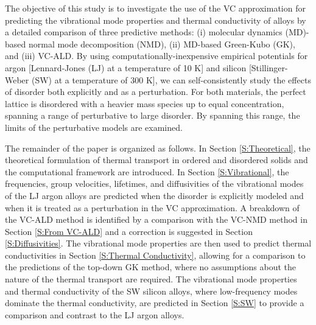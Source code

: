 \documentclass[aps,prb,onecolumn,preprint,footinbib,superscriptaddress,amsmath,amssymb,floatfix]{revtex4}
\begin{document}
The objective of this study is to investigate the use of the VC 
approximation for predicting the vibrational mode properties and 
thermal conductivity of alloys by a detailed comparison 
of three predictive methods: (i) molecular dynamics (MD)-based 
normal mode decomposition (NMD), (ii) MD-based Green-Kubo (GK), 
and (iii) VC-ALD. By using computationally-inexpensive  
empirical potentials for argon [Lennard-Jones (LJ) at a temperature of 10 K]
\cite{ashcroft_solid_1976} 
and silicon [Stillinger-Weber (SW) at a temperature of 300 K],
\cite{stillinger_computer_1985}   
we can self-consistently study the effects of disorder both explicitly 
and as a perturbation. For both materials, the perfect lattice is 
disordered with a heavier mass species up to equal 
concentration, spanning 
a range of perturbative to large disorder. By spanning this range, 
the limits of the perturbative models are examined.

The remainder of the paper is organized as follows. 
In Section \ref{S:Theoretical}, the theoretical 
formulation of thermal transport in ordered and disordered solids 
and the computational framework are introduced. 
In Section \ref{S:Vibrational}, the frequencies, 
group velocities, lifetimes, and diffusivities of the 
vibrational modes of the LJ argon alloys are 
predicted when the disorder is explicitly modeled and when it is 
treated as a perturbation in the VC approximation. 
A breakdown of the VC-ALD method is identified by a comparison 
with the VC-NMD method in 
Section \ref{S:From VC-ALD}   
and a correction is suggested in Section \ref{S:Diffusivities}. 
The vibrational 
mode properties are then used to predict thermal conductivities 
in Section \ref{S:Thermal Conductivity}, 
allowing for a comparison to the predictions of the top-down  
GK method, where no assumptions about the nature of the 
thermal transport are required. The vibrational mode properties and 
thermal conductivity of the SW silicon alloys, where low-frequency modes 
dominate the thermal conductivity, are predicted in 
Section \ref{S:SW} to provide a comparison and contrast to the 
LJ argon alloys. 


\end{document}
